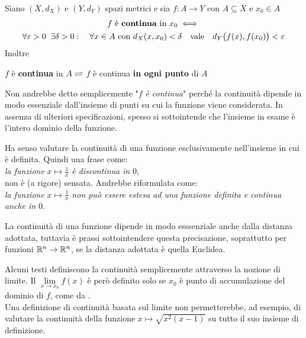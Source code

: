 \begin{definition}
	\label{def:funz_cont}
	Siano $(X,d_X)$ e $(Y,d_Y)$ spazi metrici e sia $f: A \to Y$ con $A \subseteq X$ e $x_0 \in A$
	\begin{equation*}
		\begin{gathered}
			f \text{ è \textbf{continua} in } x_0 \iff\\
			\forall \varepsilon > 0\;\;\exists \delta > 0:\quad \forall x \in A \text{ con } d_X(x,x_0)<\delta \quad \text{vale} \quad d_Y \bigl(f(x),f(x_0)\bigr) < \varepsilon
		\end{gathered}
	\end{equation*}
	Inoltre
	\begin{center}
		$f$ è \textbf{continua} in $A\rightleftharpoons$ $f$ è continua \textbf{in ogni punto} di $A$
	\end{center}
	\begin{note}
		Non andrebbe detto semplicemente "$f$ \textit{è continua}" perché la continuità dipende in modo essenziale dall'insieme di punti su cui la funzione viene considerata. In assenza di ulteriori specificazioni, spesso si sottointende che l'insieme in esame è l'intero dominio della funzione.
	\end{note}
	\begin{note}
		Ha senso valutare la continuità di una funzione esclusivamente nell'insieme in cui è definita. Quindi una frase come:\\
		\textit{la funzione} $x \mapsto \frac{1}{x}$ \textit{è discontinua in} $0$,\\
		non è (a rigore) sensata. Andrebbe riformulata come:\\
		\textit{la funzione} $x \mapsto \frac{1}{x}$ \textit{non può essere estesa ad una funzione definita e continua anche in} $0$.
	\end{note}
	\begin{note}
		La continuità di una funzione dipende in modo esssenziale anche dalla distanza adottata, tuttavia è prassi sottointendere questa precisazione, soprattutto per funzioni $\mathbb{R}^n \to \mathbb{R}^n$, se la distanza adottata è quella Euclidea.
	\end{note}
\end{definition}
\begin{observation}
	Alcuni testi definiscono la continuità semplicemente attraverso la nozione di limite. Il $\lim\limits_{x \to x_0} f(x)$ è però definito solo se $x_0$ è punto di accumulazione del dominio di $f$, come da .\\
	Una definizione di continuità basata sul limite non permetterebbe, ad esempio, di valutare la continuità della funzione $x \mapsto \sqrt{x^2(x-1)}$ su tutto il suo insieme di definizione.
\end{observation}
